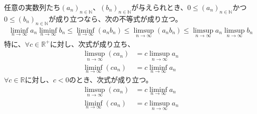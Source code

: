 \documentclass[dvipdfmx]{jsarticle}
\begin{document}
\begin{thm}\label{4.1.6.7}
任意の実数列たち$\left( a_{n} \right)_{n \in \mathbb{N}}$、$\left( b_{n} \right)_{n \in \mathbb{N}}$が与えられとき、$0 \leq \left( a_{n} \right)_{n \in \mathbb{N}}$かつ$0 \leq \left( b_{n} \right)_{n \in \mathbb{N}}$が成り立つなら、次の不等式が成り立つ。
\begin{align*}
\liminf_{n \rightarrow \infty}a_{n}\liminf_{n \rightarrow \infty}b_{n} \leq \liminf_{n \rightarrow \infty}\left( a_{n}b_{n} \right) \leq \limsup_{n \rightarrow \infty}\left( a_{n}b_{n} \right) \leq \limsup_{n \rightarrow \infty}a_{n}\limsup_{n \rightarrow \infty}b_{n}
\end{align*}
特に、$\forall c \in \mathbb{R}^{+}$に対し、次式が成り立ち、
\begin{align*}
\limsup_{n \rightarrow \infty}\left( ca_{n} \right) &= c\limsup_{n \rightarrow \infty}a_{n}\\
\liminf_{n \rightarrow \infty}\left( ca_{n} \right) &= c\liminf_{n \rightarrow \infty}a_{n}
\end{align*}
$\forall c \in \mathbb{R}$に対し、$c < 0$のとき、次式が成り立つ。
\begin{align*}
\limsup_{n \rightarrow \infty}\left( ca_{n} \right) &= c\liminf_{n \rightarrow \infty}a_{n}\\
\liminf_{n \rightarrow \infty}\left( ca_{n} \right) &= c\limsup_{n \rightarrow \infty}a_{n}
\end{align*}
\end{thm}
\end{document}
